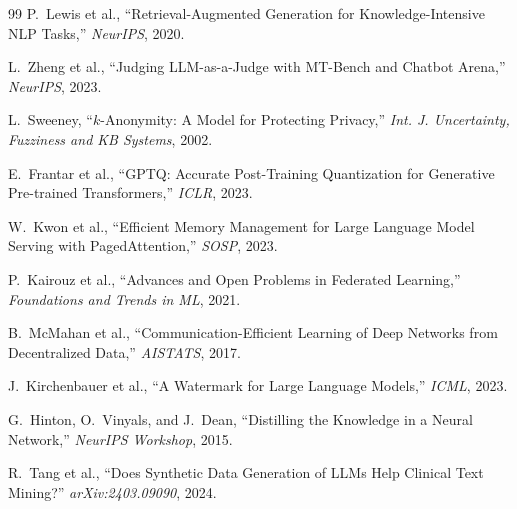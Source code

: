 \documentclass[11pt, a4paper]{article}
\begin{document}
\begin{thebibliography}{99}
P.~Lewis et al., ``Retrieval-Augmented Generation for Knowledge-Intensive NLP Tasks,'' \textit{NeurIPS}, 2020.

L.~Zheng et al., ``Judging LLM-as-a-Judge with MT-Bench and Chatbot Arena,'' \textit{NeurIPS}, 2023.

L.~Sweeney, ``$k$-Anonymity: A Model for Protecting Privacy,'' \textit{Int. J. Uncertainty, Fuzziness and KB Systems}, 2002.

E.~Frantar et al., ``GPTQ: Accurate Post-Training Quantization for Generative Pre-trained Transformers,'' \textit{ICLR}, 2023.

W.~Kwon et al., ``Efficient Memory Management for Large Language Model Serving with PagedAttention,'' \textit{SOSP}, 2023.

P.~Kairouz et al., ``Advances and Open Problems in Federated Learning,'' \textit{Foundations and Trends in ML}, 2021.

B.~McMahan et al., ``Communication-Efficient Learning of Deep Networks from Decentralized Data,'' \textit{AISTATS}, 2017.

J.~Kirchenbauer et al., ``A Watermark for Large Language Models,'' \textit{ICML}, 2023.

G.~Hinton, O.~Vinyals, and J.~Dean, ``Distilling the Knowledge in a Neural Network,'' \textit{NeurIPS Workshop}, 2015.

R.~Tang et al., ``Does Synthetic Data Generation of LLMs Help Clinical Text Mining?'' \textit{arXiv:2403.09090}, 2024.

\end{thebibliography}
\end{document}
